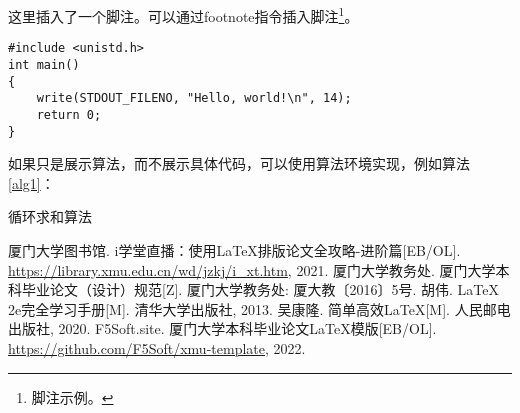 \documentclass{xmu}
\begin{document}
这里插入了一个脚注。可以通过footnote指令插入脚注\footnote{脚注示例。}。
\begin{verbatim}
#include <unistd.h>
int main()
{
    write(STDOUT_FILENO, "Hello, world!\n", 14);
    return 0;
}
\end{verbatim}
如果只是展示算法，而不展示具体代码，可以使用算法环境实现，例如算法 \ref{alg1}：
\begin{algorithm}[!htb]
    \caption{循环求和算法}\label{alg1}
\end{algorithm}


\begin{reference}
    \begin{thebibliography}{5}
         厦门大学图书馆. i学堂直播：使用LaTeX排版论文全攻略-进阶篇[EB/OL]. \url{https://library.xmu.edu.cn/wd/jzkj/i_xt.htm}, 2021.
         厦门大学教务处. 厦门大学本科毕业论文（设计）规范[Z]. 厦门大学教务处: 厦大教〔2016〕5号.
         胡伟. LaTeX 2e完全学习手册[M]. 清华大学出版社, 2013.
         吴康隆. 简单高效LaTeX[M]. 人民邮电出版社, 2020.
         F5Soft.site. 厦门大学本科毕业论文LaTeX模版[EB/OL]. \url{https://github.com/F5Soft/xmu-template}, 2022.
    \end{thebibliography}
\end{reference}

\end{document}

